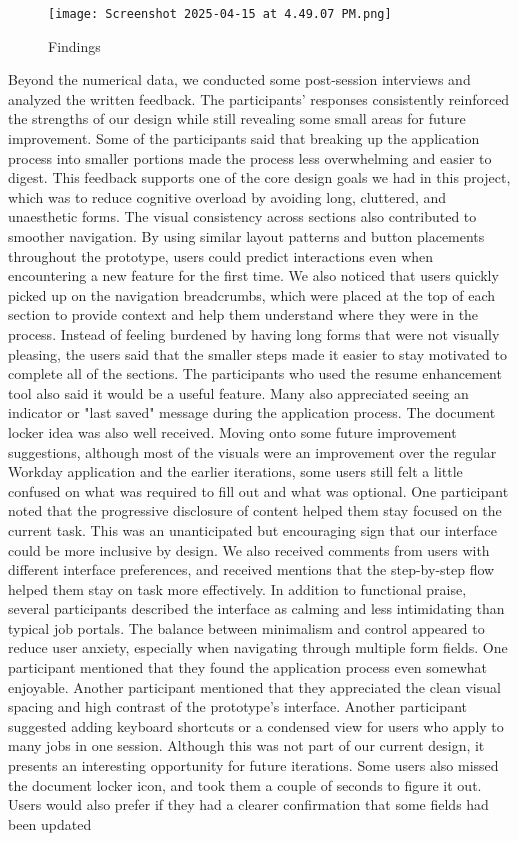 \documentclass[
	letterpaper, %
]{jdf}
\begin{document}
\begin{sloppypar}
\begin{figure}
    \centering
    \texttt{[image: Screenshot 2025-04-15 at 4.49.07 PM.png]}
    \caption{Findings}
    \label{fig:enter-label}
\end{figure}

Beyond the numerical data, we conducted some post-session interviews and analyzed the written feedback. The participants’ responses consistently reinforced the strengths of our design while still revealing some small areas for future improvement. Some of the participants said that breaking up the application process into smaller portions made the process less overwhelming and easier to digest. This feedback supports one of the core design goals we had in this project, which was to reduce cognitive overload by avoiding long, cluttered, and unaesthetic forms. The visual consistency across sections also contributed to smoother navigation. By using similar layout patterns and button placements throughout the prototype, users could predict interactions even when encountering a new feature for the first time. We also noticed that users quickly picked up on the navigation breadcrumbs, which were placed at the top of each section to provide context and help them understand where they were in the process. Instead of feeling burdened by having long forms that were not visually pleasing, the users said that the smaller steps made it easier to stay motivated to complete all of the sections. The participants who used the resume enhancement tool also said it would be a useful feature. Many also appreciated seeing an indicator or "last saved" message during the application process. The document locker idea was also well received. Moving onto some future improvement suggestions, although most of the visuals were an improvement over the regular Workday application and the earlier iterations, some users still felt a little confused on what was required to fill out and what was optional. One participant noted that the progressive disclosure of content helped them stay focused on the current task. This was an unanticipated but encouraging sign that our interface could be more inclusive by design. We also received comments from users with different interface preferences, and received mentions that the step-by-step flow helped them stay on task more effectively. In addition to functional praise, several participants described the interface as calming and less intimidating than typical job portals. The balance between minimalism and control appeared to reduce user anxiety, especially when navigating through multiple form fields. One participant mentioned that they found the application process even somewhat enjoyable. Another participant mentioned that they appreciated the clean visual spacing and high contrast of the prototype’s interface. Another participant suggested adding keyboard shortcuts or a condensed view for users who apply to many jobs in one session. Although this was not part of our current design, it presents an interesting opportunity for future iterations. Some users also missed the document locker icon, and took them a couple of seconds to figure it out. Users would also prefer if they had a clearer confirmation that some fields had been updated 
\end{sloppypar}
\end{document}
